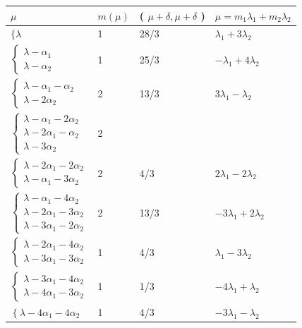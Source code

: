 \documentclass[10pt]{article}
\begin{document}
\begin{center}
\begin{tabular}{|l|l|l|l|}
\hline
$\mu$ & $m(\mu)$ & ( $\mu+\delta, \mu+\delta$ ) & $\mu=m_{1} \lambda_{1}+m_{2} \lambda_{2}$ \\
\hline
$\{\lambda$ & 1 & 28/3 & $\lambda_{1}+3 \lambda_{2}$ \\
\hline
$\left\{\begin{array}{l}\lambda-\alpha_{1} \\ \lambda-\alpha_{2}\end{array}\right.$ & 1 & 25/3 & $-\lambda_{1}+4 \lambda_{2}$ \\
\hline
$\left\{\begin{array}{l}\lambda-\alpha_{1}-\alpha_{2} \\ \lambda-2 \alpha_{2}\end{array}\right.$ & 2 & 13/3 & $3 \lambda_{1}-\lambda_{2}$ \\
\hline
$\left\{\begin{array}{l}\lambda-\alpha_{1}-2 \alpha_{2} \\ \lambda-2 \alpha_{1}-\alpha_{2} \\ \lambda-3 \alpha_{2}\end{array}\right.$ & 2 &  &  \\
\hline
$\left\{\begin{array}{l}\lambda-2 \alpha_{1}-2 \alpha_{2} \\ \lambda-\alpha_{1}-3 \alpha_{2}\end{array}\right.$ & 2 & 4/3 & $2 \lambda_{1}-2 \lambda_{2}$ \\
\hline
$\left\{\begin{array}{l}\lambda-\alpha_{1}-4 \alpha_{2} \\ \lambda-2 \alpha_{1}-3 \alpha_{2} \\ \lambda-3 \alpha_{1}-2 \alpha_{2}\end{array}\right.$ & 2 & 13/3 & $-3 \lambda_{1}+2 \lambda_{2}$ \\
\hline
$\left\{\begin{array}{l}\lambda-2 \alpha_{1}-4 \alpha_{2} \\ \lambda-3 \alpha_{1}-3 \alpha_{2}\end{array}\right.$ & 1 & 4/3 & $\lambda_{1}-3 \lambda_{2}$ \\
\hline
$\left\{\begin{array}{l}\lambda-3 \alpha_{1}-4 \alpha_{2} \\ \lambda-4 \alpha_{1}-3 \alpha_{2}\end{array}\right.$ & 1 & 1/3 & $-4 \lambda_{1}+\lambda_{2}$ \\
\hline
$\left\{\lambda-4 \alpha_{1}-4 \alpha_{2}\right.$ & 1 & 4/3 & $-3 \lambda_{1}-\lambda_{2}$ \\
\hline
\end{tabular}
\end{center}
\end{document}
